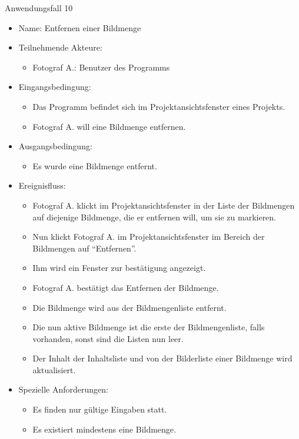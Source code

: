 	\begin{description}
		\item[Anwendungsfall 10]
	\end{description}
	
	\begin{itemize}
		\item Name: Entfernen einer Bildmenge
		\item Teilnehmende Akteure:
		\begin{itemize}
			\item	Fotograf A.: Benutzer des Programms		
		\end{itemize}
		\item Eingangsbedingung:
		\begin{itemize}
			\item	Das Programm befindet sich im Projektansichtsfenster eines Projekts.
			\item Fotograf A. will eine Bildmenge entfernen.
		\end{itemize}
		\item Ausgangsbedingung:
		\begin{itemize}
			\item	Es wurde eine Bildmenge entfernt.	
		\end{itemize}
		\item Ereignisfluss:
		\begin{itemize}
			\item Fotograf A. klickt im Projektansichtsfenster in der Liste der Bildmengen auf diejenige Bildmenge, die er entfernen will, um sie zu markieren.		
			\item Nun klickt Fotograf A. im Projektansichtsfenster im Bereich der Bildmengen auf "`Entfernen"'.
			\item Ihm wird ein Fenster zur bestätigung angezeigt.
			\item Fotograf A. bestätigt das Entfernen der Bildmenge.
			\item Die Bildmenge wird aus der Bildmengenliste entfernt.
			\item Die nun aktive Bildmenge ist die erste der Bildmengenliste, falls vorhanden, sonst sind die Listen nun leer.
			\item Der Inhalt der Inhaltsliste und von der Bilderliste einer Bildmenge wird aktualisiert. 
		\end{itemize}
		\item Spezielle Anforderungen:
		\begin{itemize}
			\item	Es finden nur gültige Eingaben statt.
			\item Es existiert mindestens eine Bildmenge.
		\end{itemize}			
	\end{itemize}
	

